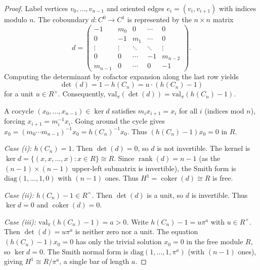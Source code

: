 \documentclass[10pt,a4paper]{amsart}
\DeclareMathOperator{\coker}{coker}                   %
\DeclareMathOperator{\rank}{rank}
\newcommand{\Ring}{R}                          %
\newcommand{\coboundary}{d}                           %
\newcommand{\unif}{\pi}                        %
\newcommand{\valpi}{\mathrm{val}_{\unif}}                   %
\begin{document}
\begin{proof}
Label vertices $v_0, \ldots, v_{n-1}$ and oriented edges $e_i = (v_i, v_{i+1})$ with indices modulo $n$. The coboundary $\coboundary: C^0 \to C^1$ is represented by the $n \times n$ matrix
\[
\coboundary = \begin{pmatrix}
-1 & m_0 & 0 & \cdots & 0 \\
0 & -1 & m_1 & \cdots & 0 \\
\vdots & \vdots & \ddots & \ddots & \vdots \\
0 & 0 & \cdots & -1 & m_{n-2} \\
m_{n-1} & 0 & \cdots & 0 & -1
\end{pmatrix}.
\]
Computing the determinant by cofactor expansion along the last row yields
\[
\det(\coboundary) = 1 - h(C_n) = u \cdot (h(C_n) - 1)
\]
for a unit $u \in \Ring^\times$. Consequently, $\valpi(\det(\coboundary)) = \valpi(h(C_n) - 1)$.

A cocycle $(x_0, \ldots, x_{n-1}) \in \ker \coboundary$ satisfies $m_i x_{i+1} = x_i$ for all $i$ (indices mod $n$), forcing $x_{i+1} = m_i^{-1}x_i$. Going around the cycle gives $x_0 = (m_0 \cdots m_{n-1})^{-1}x_0 = h(C_n)^{-1}x_0$. Thus $(h(C_n) - 1)x_0 = 0$ in $\Ring$.

\textit{Case (i): $h(C_n) = 1$.} Then $\det(\coboundary) = 0$, so $\coboundary$ is not invertible. The kernel is $\ker \coboundary = \{(x,x,\ldots,x) : x \in \Ring\} \cong \Ring$. Since $\rank(\coboundary) = n-1$ (as the $(n-1) \times (n-1)$ upper-left submatrix is invertible), the Smith form is $\mathrm{diag}(1,\ldots,1,0)$ with $(n-1)$ ones. Thus $H^1 = \coker(\coboundary) \cong \Ring$ is free.

\textit{Case (ii): $h(C_n) - 1 \in \Ring^\times$.} Then $\det(\coboundary)$ is a unit, so $\coboundary$ is invertible. Thus $\ker \coboundary = 0$ and $\coker(\coboundary) = 0$.

\textit{Case (iii): $\valpi(h(C_n)-1) = a > 0$.} Write $h(C_n) - 1 = u\unif^a$ with $u \in \Ring^\times$. Then $\det(\coboundary) = u\unif^a$ is neither zero nor a unit. The equation $(h(C_n) - 1)x_0 = 0$ has only the trivial solution $x_0 = 0$ in the free module $\Ring$, so $\ker \coboundary = 0$. The Smith normal form is $\mathrm{diag}(1,\ldots,1,\unif^a)$ (with $(n-1)$ ones), giving $H^1 \cong \Ring/\unif^a$, a single bar of length $a$.
\end{proof}
\end{document}
